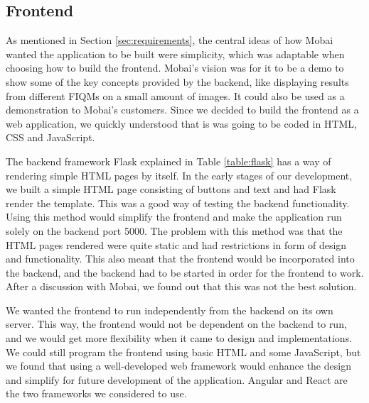 \subsection*{Frontend}
As mentioned in Section \ref{sec:requirements}, the central ideas of how Mobai wanted the application to be built were simplicity, which was adaptable when choosing how to build the frontend. Mobai's vision was for it to be a demo to show some of the key concepts provided by the backend, like displaying results from different FIQMs on a small amount of images. It could also be used as a demonstration to Mobai's customers. Since we decided to build the frontend as a web application, we quickly understood that is was going to be coded in HTML, CSS and JavaScript. 

The backend framework Flask explained in Table \ref{table:flask} has a way of rendering simple HTML pages by itself. In the early stages of our development, we built a simple HTML page consisting of buttons and text and had Flask render the template. This was a good way of testing the backend functionality. Using this method would simplify the frontend and make the application run solely on the backend port 5000. The problem with this method was that the HTML pages rendered were quite static and had restrictions in form of design and functionality. This also meant that the frontend would be incorporated into the backend, and the backend had to be started in order for the frontend to work. After a discussion with Mobai, we found out that this was not the best solution. 

We wanted the frontend to run independently from the backend on its own server. This way, the frontend would not be dependent on the backend to run, and we would get more flexibility when it came to design and implementations. We could still program the frontend using basic HTML and some JavaScript, but we found that using a well-developed web framework would enhance the design and simplify for future development of the application. Angular and React are the two frameworks we considered to use. 

